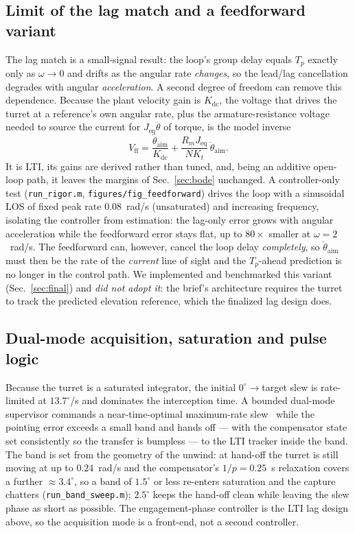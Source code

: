 \documentclass[conference]{IEEEtran}
\begin{document}
\subsection{Limit of the lag match and a feedforward variant}\label{sec:ff}
The lag match is a small-signal result: the loop's group delay equals $T_p$ exactly only as $\omega\to0$ and drifts as the angular rate \emph{changes}, so the lead/lag cancellation degrades with angular \emph{acceleration}. A second degree of freedom can remove this dependence. Because the plant velocity gain is $K_{\mathrm{dc}}$, the voltage that drives the turret at a reference's own angular rate, plus the armature-resistance voltage needed to source the current for $J_{\mathrm{eq}}\ddot\theta$ of torque, is the model inverse
\begin{equation}
V_{\mathrm{ff}}=\frac{\dot\theta_{\mathrm{aim}}}{K_{\mathrm{dc}}}+\frac{R_mJ_{\mathrm{eq}}}{NK_t}\,\ddot\theta_{\mathrm{aim}}.
\label{eq:ff}
\end{equation}
It is LTI, its gains are derived rather than tuned, and, being an additive open-loop path, it leaves the margins of Sec.~\ref{sec:bode} unchanged. A controller-only test (\texttt{run\_rigor.m}, \texttt{figures/fig\_feedforward}) drives the loop with a sinusoidal LOS of fixed peak rate $0.08$~rad/s (unsaturated) and increasing frequency, isolating the controller from estimation: the lag-only error grows with angular acceleration while the feedforward error stays flat, up to $80\times$ smaller at $\omega=2$~rad/s. The feedforward can, however, cancel the loop delay \emph{completely}, so $\dot\theta_{\mathrm{aim}}$ must then be the rate of the \emph{current} line of sight and the $T_p$-ahead prediction is no longer in the control path. We implemented and benchmarked this variant (Sec.~\ref{sec:final}) and \emph{did not adopt it}: the brief's architecture requires the turret to track the predicted elevation reference, which the finalized lag design does.

\subsection{Dual-mode acquisition, saturation and pulse logic}\label{sec:acq}
Because the turret is a saturated integrator, the initial $0^\circ\!\to$target slew is rate-limited at $13.7^\circ$/s and dominates the interception time. A bounded dual-mode supervisor commands a near-time-optimal maximum-rate slew~\cite{athans} while the pointing error exceeds a small band and hands off --- with the compensator state set consistently so the transfer is bumpless --- to the LTI tracker inside the band. The band is set from the geometry of the unwind: at hand-off the turret is still moving at up to $0.24$~rad/s and the compensator's $1/p=0.25$~s relaxation covers a further $\approx3.4^\circ$, so a band of $1.5^\circ$ or less re-enters saturation and the capture chatters (\texttt{run\_band\_sweep.m}); $2.5^\circ$ keeps the hand-off clean while leaving the slew phase as short as possible. The engagement-phase controller is the LTI lag design above, so the acquisition mode is a front-end, not a second controller.
\end{document}
